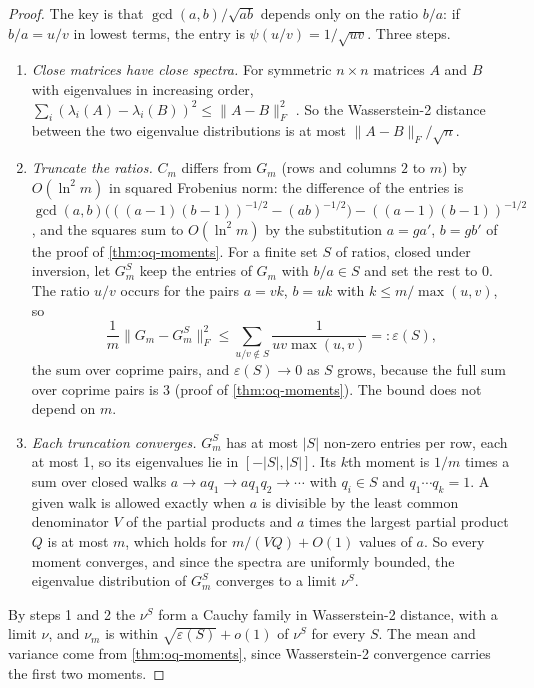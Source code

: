\begin{proof}
The key is that $\gcd(a,b)/\sqrt{ab}$ depends only on the ratio $b/a$: if $b/a = u/v$ in lowest terms, the entry is $\psi(u/v) = 1/\sqrt{uv}$. Three steps.
\begin{enumerate}
\item \emph{Close matrices have close spectra.} For symmetric $n\times n$ matrices $A$ and $B$ with eigenvalues in increasing order, $\sum_i(\lambda_i(A) - \lambda_i(B))^2 \le \|A - B\|_F^2$ \citep{HoffmanWielandt1953}. So the Wasserstein-2 distance between the two eigenvalue distributions is at most $\|A - B\|_F/\sqrt n$.
\item \emph{Truncate the ratios.} $C_m$ differs from $G_m$ (rows and columns $2$ to $m$) by $O(\ln^2m)$ in squared Frobenius norm: the difference of the entries is $\gcd(a,b)\bigl(((a-1)(b-1))^{-1/2} - (ab)^{-1/2}\bigr) - ((a-1)(b-1))^{-1/2}$, and the squares sum to $O(\ln^2m)$ by the substitution $a = ga'$, $b = gb'$ of the proof of \cref{thm:oq-moments}. For a finite set $S$ of ratios, closed under inversion, let $G_m^S$ keep the entries of $G_m$ with $b/a \in S$ and set the rest to 0. The ratio $u/v$ occurs for the pairs $a = vk$, $b = uk$ with $k \le m/\max(u,v)$, so
\[
  \frac{1}{m}\|G_m - G_m^S\|_F^2 \le \sum_{u/v \notin S}\frac{1}{uv\max(u,v)} =: \varepsilon(S),
\]
the sum over coprime pairs, and $\varepsilon(S) \to 0$ as $S$ grows, because the full sum over coprime pairs is 3 (proof of \cref{thm:oq-moments}). The bound does not depend on $m$.
\item \emph{Each truncation converges.} $G_m^S$ has at most $|S|$ non-zero entries per row, each at most 1, so its eigenvalues lie in $[-|S|, |S|]$. Its $k$th moment is $1/m$ times a sum over closed walks $a \to aq_1 \to aq_1q_2 \to \cdots$ with $q_i \in S$ and $q_1\cdots q_k = 1$. A given walk is allowed exactly when $a$ is divisible by the least common denominator $V$ of the partial products and $a$ times the largest partial product $Q$ is at most $m$, which holds for $m/(VQ) + O(1)$ values of $a$. So every moment converges, and since the spectra are uniformly bounded, the eigenvalue distribution of $G_m^S$ converges to a limit $\nu^S$.
\end{enumerate}
By steps 1 and 2 the $\nu^S$ form a Cauchy family in Wasserstein-2 distance, with a limit $\nu$, and $\nu_m$ is within $\sqrt{\varepsilon(S)} + o(1)$ of $\nu^S$ for every $S$. The mean and variance come from \cref{thm:oq-moments}, since Wasserstein-2 convergence carries the first two moments.
\end{proof}

